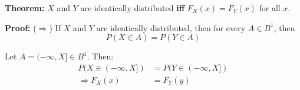 \documentclass{article}
\begin{document}
\noindent \textbf{Theorem:} $X$ and $Y$ are identically distributed \textbf{iff} $F_X(x) = F_Y(x)$ for all $x$.

\noindent \textbf{Proof:} ($\Rightarrow$) If $X$ and $Y$ are identically distributed, then for every $A \in B^1$, then
\begin{equation*}
    P(X \in A) = P(Y \in A)
\end{equation*}

Let $A = (-\infty, X] \in B^1$. Then:
\begin{equation*}
    \begin{split}
        P(X \in (-\infty,X]) &= P(Y \in (-\infty,X])\\
        \Rightarrow F_X(x) &= F_Y(y)
    \end{split}
\end{equation*}
\end{document}
